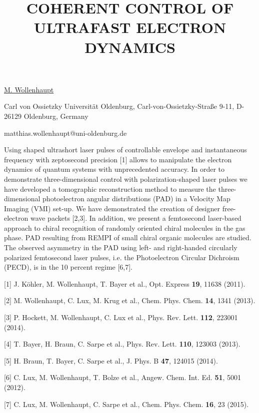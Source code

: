 \title{COHERENT CONTROL OF ULTRAFAST ELECTRON DYNAMICS}

\underline{M. Wollenhaupt} 

{\normalsize{\vspace{-4mm}
Carl von Ossietzky Universit\"{a}t Oldenburg,
Carl-von-Ossietzky-Stra{\ss}e 9-11,
D-26129 Oldenburg, Germany 

\email matthias.wollenhaupt@uni-oldenburg.de}}

Using shaped ultrashort laser pulses of controllable envelope and instantaneous frequency with zeptosecond precision [1] allows to manipulate the electron dynamics of quantum systems with unprecedented accuracy. In order to demonstrate three-dimensional control with polarization-shaped laser pulses we have developed a tomographic reconstruction method to measure the three-dimensional photoelectron angular distributions (PAD) in a Velocity Map Imaging (VMI) set-up. We have demonstrated the creation of designer free-electron wave packets [2,3]. In addition, we present a femtosecond laser-based approach to chiral recognition of randomly oriented chiral molecules in the gas phase. PAD resulting from REMPI of small chiral organic molecules are studied. The observed asymmetry in the PAD using left- and right-handed circularly polarized femtosecond laser pulses, i.e. the Photoelectron Circular Dichroism (PECD), is in the 10 percent regime [6,7].

{\normalsize
[1] J. K\"{o}hler, M. Wollenhaupt, T. Bayer et al., Opt. Express \textbf{19}, 11638 (2011).
\vsp

[2] M. Wollenhaupt, C. Lux, M. Krug et al., Chem. Phys. Chem. \textbf{14}, 1341 (2013).
\vsp

[3] P. Hockett, M. Wollenhaupt, C. Lux et al., Phys. Rev. Lett. \textbf{112}, 223001 (2014).
\vsp

[4] T. Bayer, H. Braun, C. Sarpe et al., Phys. Rev. Lett. \textbf{110}, 123003 (2013).
\vsp

[5] H. Braun, T. Bayer, C. Sarpe et al., J. Phys. B \textbf{47}, 124015 (2014).
\vsp

[6] C. Lux, M. Wollenhaupt, T. Bolze et al., Angew. Chem. Int. Ed. \textbf{51}, 5001 (2012).
\vsp

[7] C. Lux, M. Wollenhaupt, C. Sarpe et al., Chem. Phys. Chem. \textbf{16}, 23 (2015).
}

\vspace{\baselineskip}
